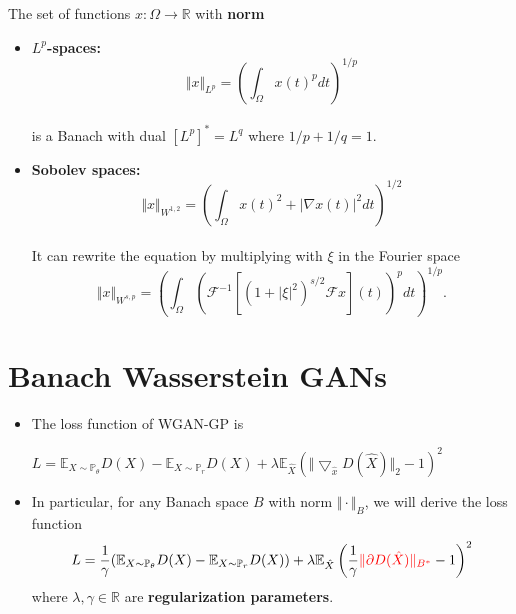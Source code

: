\documentclass[landscape,headrule,footrule]{foils}
\begin{document}
\begin{frame}
\begin{flushleft}
The set of functions $x:\Omega \rightarrow \mathbb{R}$ with \textbf{norm}
\begin{itemize}
\item \textbf{$L^p$-spaces:} 
\begin{equation}
\Vert x \Vert_{L^p} = \left( \int_{\Omega} x(t)^p dt \right)^{1/p}
\end{equation}
\\
is a Banach with dual $[L^p]^* = L^q$ where $1/p + 1/q = 1$.
\\
\item \textbf{Sobolev spaces:}
\begin{equation}
\Vert x \Vert_{W^{1,2}} = \left( \int_{\Omega} x(t)^2 + |\nabla x(t)|^2 dt \right)^{1/2}
\end{equation}
\\
It can rewrite the equation by multiplying with $\xi$ in the Fourier space
\begin{equation}
\Vert x \Vert_{W^{s,p}} = \left( \int_{\Omega} \left( \mathcal{F}^{-1} \left[(1+| \xi |^2)^{s/2} \mathcal{F}x \right] (t) \right)^p dt \right)^{1/p}.
\end{equation}
\end{itemize}
\end{flushleft}
\end{frame}

\section{Banach Wasserstein GANs}
\tableofcontents
\begin{frame}
\begin{flushleft}
\begin{itemize}
\item The loss function of WGAN-GP is
\begin{center}
$L = \mathbb{E}_{X \sim \mathbb{P}_{\theta}} D(X)-\mathbb{E}_{X \sim \mathbb{P}_{r}} D(X) + \lambda \mathbb{E}_{\hat{X}} \left(\Vert \bigtriangledown_{\hat{x}} D(\hat{X}) \Vert_{2} - 1 \right)^2$
\end{center}
\item In particular, for any Banach space $B$ with norm $ \Vert\cdot\Vert_B$, we will derive the loss function
\begin{equation}
L = \dfrac{1}{\gamma} (\mathbb{E}_{X \sim \mathbb{P}_{\theta}} D(X)-\mathbb{E}_{X \sim \mathbb{P}_{r}} D(X)) + \lambda \mathbb{E}_{\hat{X}} \left(\dfrac{1}{\gamma} \textcolor{red}{\Vert \partial D(\hat{X}) \Vert_{B^*}} - 1 \right)^2
\end{equation}
where $\lambda,\gamma \in \mathbb{R}$ are \textbf{regularization parameters}.
\end{itemize}
\end{flushleft}
\end{frame}
\end{document}
